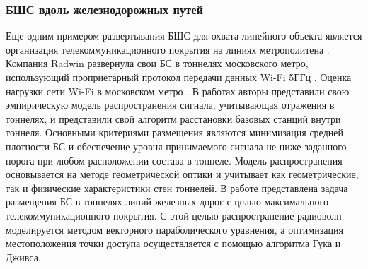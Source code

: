 









\subsubsection{БШС вдоль железнодорожных путей}

Еще одним примером развертывания БШС для охвата линейного объекта является организация телекоммуникационного покрытия на линиях метрополитена \cite{Alekseev2021, radwin_moscow_metro, Soykin2020,aderkina2020, aderkina2021}. Компания Radwin развернула свои БС в тоннелях московского метро, использующий проприетарный протокол передачи данных Wi-Fi 5ГГц \cite{radwin_moscow_metro, Soykin2020}. Оценка нагрузки сети Wi-Fi в московском метро \cite{Alekseev2021}. В работах \cite{aderkina2021, aderkina2020} авторы представили свою эмпирическую модель распространения сигнала, учитывающая отражения в тоннелях, и представили свой алгоритм расстановки базовых станций внутри тоннеля. Основными критериями размещения являются минимизация средней плотности БС и обеспечение уровня принимаемого сигнала не ниже заданного порога при любом расположении состава в тоннеле. Модель распространения основывается на методе геометрической оптики и учитывает как геометрические, так и физические характеристики стен тоннелей.  
В работе \cite{Zhang2018} представлена задача размещения БС в тоннелях линий железных дорог с целью максимального телекоммуникационного покрытия. С этой целью распространение радиоволн моделируется методом векторного параболического уравнения, а оптимизация местоположения точки доступа осуществляется с помощью алгоритма Гука и Дживса.







